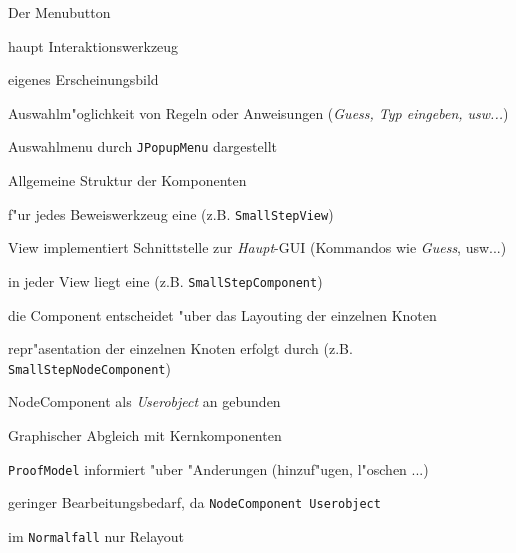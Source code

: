  {

  \begin{itemgroup}{Der Menubutton}
    \item haupt Interaktionswerkzeug
    \item eigenes Erscheinungsbild
    \item Auswahlm"oglichkeit von Regeln oder Anweisungen ({\it Guess, Typ eingeben, usw...})
    \item Auswahlmenu durch {\tt JPopupMenu} dargestellt
  \end{itemgroup}

}

 {
  \begin{itemgroup}{Allgemeine Struktur der Komponenten}
    \item f"ur jedes Beweiswerkzeug eine  (z.B. {\tt SmallStepView})
    \item View implementiert Schnittstelle zur {\it Haupt}-GUI (Kommandos wie {\it Guess}, usw...)
    \item in jeder View liegt eine  (z.B. {\tt SmallStepComponent})
    \item die Component entscheidet "uber das Layouting der einzelnen Knoten
    \item repr"asentation der einzelnen Knoten erfolgt durch  (z.B. {\tt SmallStepNodeComponent})
    \item NodeComponent als {\it Userobject} an  gebunden
    
  \end{itemgroup}
}

 {

  \begin{itemgroup}{Graphischer Abgleich mit Kernkomponenten}
    \item {\tt ProofModel} informiert "uber "Anderungen (hinzuf"ugen, l"oschen ...)
    \item geringer Bearbeitungsbedarf, da {\tt NodeComponent Userobject} 
    \item im {\tt Normalfall} nur Relayout
  \end{itemgroup}

}


